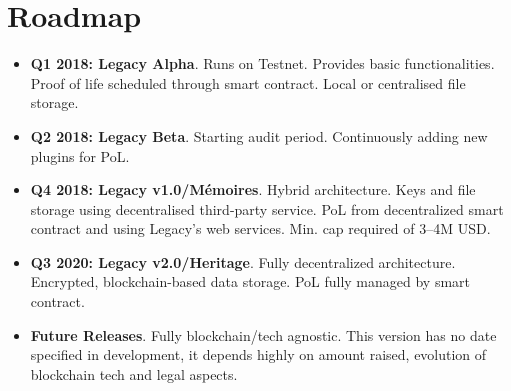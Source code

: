 \chapter{Roadmap} %
\label{cha:roadmap}

\begin{itemize}
	\item \textbf{Q1 2018: Legacy Alpha}. Runs on Testnet. Provides basic functionalities. Proof of life scheduled through smart contract. Local or centralised file storage.
	\item \textbf{Q2 2018: Legacy Beta}. Starting audit period. Continuously adding new plugins for PoL.
	\item \textbf{Q4 2018: Legacy v1.0/Mémoires}. Hybrid architecture. Keys and file storage using decentralised third-party service. PoL from decentralized smart contract and using Legacy's web services. Min. cap required of 3–4M USD.
	\item \textbf{Q3 2020: Legacy v2.0/Heritage}. Fully decentralized architecture. Encrypted, blockchain-based data storage. PoL fully managed by smart contract.
	\item \textbf{Future Releases}. Fully blockchain/tech agnostic. This version has no date specified in development, it depends highly on amount raised, evolution of blockchain tech and legal aspects.
\end{itemize}

